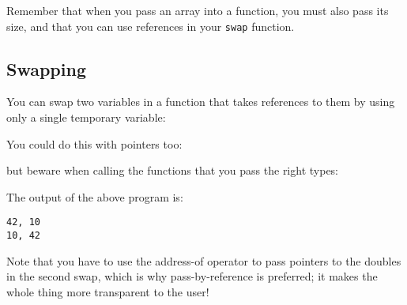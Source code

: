 \documentclass[a4paper]{scrartcl}
\begin{document}
Remember that when you pass an array into a function, you must also pass its size, and that you can use references in your \verb|swap| function.

\subsection{Swapping}
You can swap two variables in a function that takes references to them by using only a single temporary variable:



You could do this with pointers too:



but beware when calling the functions that you pass the right types:



The output of the above program is:
\begin{verbatim}
42, 10
10, 42
\end{verbatim}

Note that you have to use the address-of operator to pass pointers to the doubles in the second swap, which is why pass-by-reference is preferred; it makes the whole thing more transparent to the user!
\end{document}

